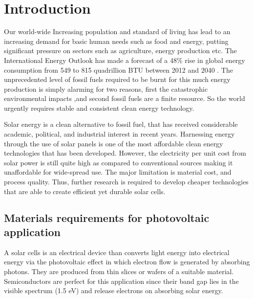 \chapter{Introduction}

Our world-wide Increasing population and standard of living has lead to an increasing demand for basic human needs such as food and energy, putting significant pressure on sectors such as agriculture, energy production etc. The International Energy Outlook has made a forecast of a 48\% rise in global energy consumption from 549 to 815 quadrillion BTU between 2012 and 2040 \cite{}. The unprecedented level of fossil fuels required to be burnt for this much energy production is simply alarming for two reasons, first the catastrophic environmental impacts ,and second fossil fuels are a finite resource. So the world urgently requires stable and consistent clean energy technology.

Solar energy is a clean alternative to fossil fuel, that has received considerable academic, political, and industrial interest in recent years. Harnessing energy through the use of solar panels is one of the most affordable clean energy technologies that has been developed. However, the electricity per unit cost from solar power is still quite high as compared to conventional sources making it unaffordable for wide-spread use. The major limitation is material cost, and process quality. Thus, further research is required to develop cheaper technologies that are able to create efficient yet durable solar cells.

\section{Materials requirements for photovoltaic application}

A solar cells is an electrical device than converts light energy into electrical energy via the photovoltaic effect in which electron flow is generated by absorbing photons. They are produced from thin slices or wafers of a suitable material. Semiconductors are perfect for this application since their band gap lies in the visible spectrum (1.5 eV) and release electrons on absorbing solar energy. 


